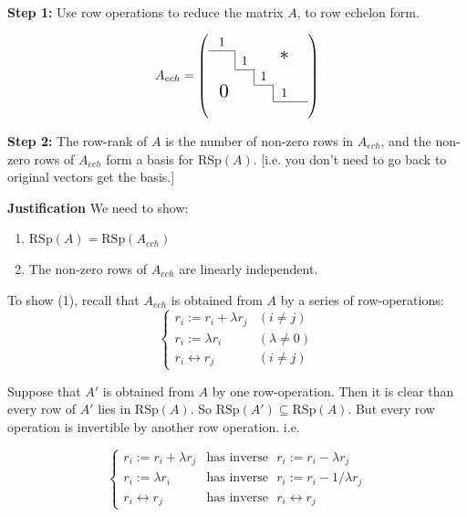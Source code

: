 \documentclass[twoside]{scrartcl}
\begin{document}
\begin{proc}~\\

\noindent \textbf{Step 1:} Use row operations to reduce the matrix $A$, to row echelon form.

\[A_{ech} =\left(
    \begin{array}{ccccc}
    1    &       &    &     & \\ \cline{1-1}
    \bord & 1       &    &  \scalebox{1.5}{*}   & \\ \cline{2-2}
          & \bord    & 1     &    & \\ \cline{3-3}
       ~\scalebox{1.5}{0}   &  & \bord & 1     &  \\ \cline{4-5}
          &          &       &  &  \\ %
  \end{array}\right)\]

\noindent \textbf{Step 2:} The row-rank of $A$ is the number of non-zero rows in $A_{ech}$, and the non-zero rows of $A_{ech}$ form a basis for $\text{RSp}(A).$ [i.e. you don't need to go back to original vectors get the basis.]
\end{proc}

\textbf{Justification} We need to show:
\begin{enumerate}
\item $\text{RSp}(A) = \text{RSp}(A_{ech})$
\item The non-zero rows of $A_{ech}$ are linearly independent. 
\end{enumerate}

To show (1), recall that $A_{ech}$ is obtained from $A$ by a series of row-operations:
\[
\begin{cases}
r_i := r_i + \lambda r_j & (i\neq j)\\
r_i := \lambda r_i & (\lambda \neq 0)\\
r_i \longleftrightarrow r_j & (i \neq j)
\end{cases} \]

Suppose that $A'$ is obtained from $A$ by one row-operation. Then it is clear than every row of $A'$ lies in $\text{RSp}(A)$. So $\text{RSp}(A') \subseteq \text{RSp}(A)$. But every row operation is invertible by another row operation. i.e. 

\[\begin{cases}
r_i := r_i + \lambda r_j & \text{has inverse ~} r_i := r_i - \lambda r_j \\
r_i := \lambda r_i & \text{has inverse ~} r_i := r_i - 1/\lambda r_j \\
r_i \longleftrightarrow r_j & \text{has inverse ~}  r_i \longleftrightarrow r_j
\end{cases} \]
\end{document}
